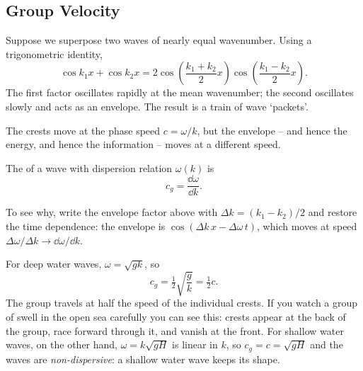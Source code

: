 \documentclass[a4paper]{scrartcl}
\begin{document}
\subsection{Group Velocity}

Suppose we superpose two waves of nearly equal wavenumber. Using a trigonometric identity,
$$
\cos k_1 x + \cos k_2 x = 2\cos\left(\frac{k_1 + k_2}{2}x\right)\cos\left(\frac{k_1 - k_2}{2}x\right).
$$
The first factor oscillates rapidly at the mean wavenumber; the second oscillates slowly and acts as an envelope. The result is a train of wave `packets'.

\begin{center}
\end{center}

The crests move at the phase speed $c = \omega/k$, but the envelope -- and hence the energy, and hence the information -- moves at a different speed.

\begin{definition}
	The  of a wave with dispersion relation $\omega(k)$ is
	$$
	c_g = \frac{\dd \omega}{\dd k}.
	$$
\end{definition}

To see why, write the envelope factor above with $\Delta k = (k_1 - k_2)/2$ and restore the time dependence: the envelope is $\cos(\Delta k \, x - \Delta\omega\, t)$, which moves at speed $\Delta\omega/\Delta k \to \dd\omega/\dd k$.

For deep water waves, $\omega = \sqrt{gk}$, so
$$
c_g = \tfrac{1}{2}\sqrt{\frac{g}{k}} = \tfrac{1}{2}c.
$$
The group travels at half the speed of the individual crests. If you watch a group of swell in the open sea carefully you can see this: crests appear at the back of the group, race forward through it, and vanish at the front. For shallow water waves, on the other hand, $\omega = k\sqrt{gH}$ is linear in $k$, so $c_g = c = \sqrt{gH}$ and the waves are \emph{non-dispersive}: a shallow water wave keeps its shape.
\end{document}
